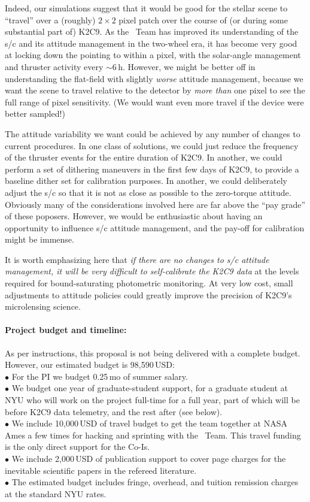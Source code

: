 \documentclass[12pt,preprint]{aastex}
\begin{document}
Indeed, our simulations suggest that it would be good for the stellar
scene to ``travel'' over a (roughly) $2\times2$ pixel patch over the
course of (or during some substantial part of) K2C9.
As the \ktwo\ Team has improved its understanding of the s/c and its
attitude management in the two-wheel era, it has become very good at
locking down the pointing to within a pixel, with the solar-angle
management and thruster activity every $\sim 6$\,h.
However, we might be better off in understanding the flat-field with
slightly \emph{worse} attitude management, because we want the scene
to travel relative to the detector by \emph{more than} one pixel to
see the full range of pixel sensitivity.
(We would want even more travel if the device were better sampled!)

The attitude variability we want could be achieved by any number of
changes to current procedures.
In one class of solutions, we could just reduce the frequency of the
thruster events for the entire duration of K2C9.
In another, we could perform a set of dithering maneuvers in the first
few days of K2C9, to provide a baseline dither set for calibration
purposes.
In another, we could deliberately adjust the s/c so that it is not as
close as possible to the zero-torque attitude.
Obviously many of the considerations involved here are far above the 
``pay grade'' of these poposers.
However, we would be enthusiastic about having an opportunity to influence
s/c attitude management, and the pay-off for calibration might be immense.

It is worth emphasizing here that \emph{if there are no changes to s/c
  attitude management, it will be very difficult to self-calibrate the
  K2C9 data} at the levels required for bound-saturating photometric monitoring.
At very low cost, small adjustments to attitude policies could greatly
improve the precision of K2C9's microlensing science.

\paragraph{Project budget and timeline:}

As per instructions, this proposal is not being delivered with a complete
budget.
However, our estimated budget is 98,590\,USD:\\
$\bullet$ For the PI we budget 0.25\,mo of summer salary.\\
$\bullet$ We budget one year of graduate-student support, for a
graduate student at NYU who will work on the project full-time for a full
year, part of which will be before K2C9 data telemetry, and the rest
after (see below).\\
$\bullet$ We include 10,000\,USD of travel budget to get the team
together at NASA Ames a few times for hacking and sprinting with the
\ktwo\ Team.  This travel funding is the only direct support for the
Co-Is.\\
$\bullet$ We include 2,000\,USD of publication support to cover page
charges for the inevitable scientific papers in the refereed
literature.\\
$\bullet$ The estimated budget includes fringe, overhead, and tuition
remission charges at the standard NYU rates.
\end{document}
